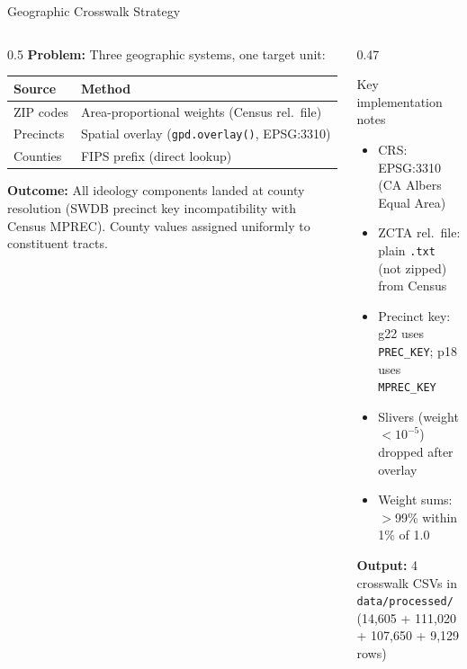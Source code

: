 \documentclass[aspectratio=169,t]{beamer}
\begin{document}
\begin{frame}{Geographic Crosswalk Strategy}
  \begin{columns}[T]
    \begin{column}{0.5\textwidth}
      \footnotesize\textbf{Problem:} Three geographic systems, one target unit:

      \vspace{0.1em}
      \begin{tabular}{p{1.6cm}p{4cm}}
        \toprule
        \textbf{Source} & \textbf{Method} \\
        \midrule
        ZIP codes & Area-proportional weights (Census rel.\ file) \\
        Precincts & Spatial overlay (\texttt{gpd.overlay()}, EPSG:3310) \\
        Counties  & FIPS prefix (direct lookup) \\
        \bottomrule
      \end{tabular}

      \vspace{0.1em}
      \textbf{Outcome:} All ideology components landed at county resolution
      (SWDB precinct key incompatibility with Census MPREC).
      County values assigned uniformly to constituent tracts.
    \end{column}
    \begin{column}{0.47\textwidth}
      \begin{block}{Key implementation notes}
        \begin{itemize}\small
          \item CRS: EPSG:3310 (CA Albers Equal Area)
          \item ZCTA rel.\ file: plain \texttt{.txt} (not zipped) from Census
          \item Precinct key: g22 uses \texttt{PREC\_KEY}; p18 uses \texttt{MPREC\_KEY}
          \item Slivers (weight $<10^{-5}$) dropped after overlay
          \item Weight sums: $>$99\% within 1\% of 1.0
        \end{itemize}
      \end{block}
      \vspace{0.1em}
      \textbf{Output:} 4 crosswalk CSVs in \texttt{data/processed/}\\
      (14,605 + 111,020 + 107,650 + 9,129 rows)
    \end{column}
  \end{columns}
\end{frame}
\end{document}
